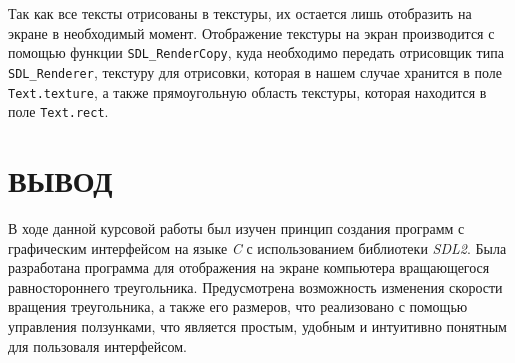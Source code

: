 \documentclass[14pt]{extarticle}
\begin{document}
{    \begin{center}
    \end{center}

    \begin{spacing}{1.5}
        Так как все тексты отрисованы в текстуры, их остается лишь отобразить на экране в необходимый момент. Отображение текстуры на экран производится с помощью функции \verb|SDL_RenderCopy|, куда необходимо передать отрисовщик типа \verb|SDL_Renderer|, текстуру для отрисовки, которая в нашем случае хранится в поле \verb|Text.texture|, а также прямоугольную область текстуры, которая находится в поле \verb|Text.rect|.
    \end{spacing}
    
    \par    
    \vfill
    \newpage
}

{
    {
        \par
        \centering\section{ВЫВОД}
        \par
    }

    \begin{spacing}{1.5}
        В ходе данной курсовой работы был изучен принцип создания программ с графическим интерфейсом на языке \textit{C} с использованием библиотеки \textit{SDL2}. Была разработана программа для отображения на экране компьютера вращающегося равностороннего треугольника. Предусмотрена возможность изменения скорости вращения треугольника, а также его размеров, что реализовано с помощью управления ползунками, что является простым, удобным и интуитивно понятным для пользоваля интерфейсом.
    \end{spacing}
    
    \par
    \vfill
    \newpage
}
\end{document}
